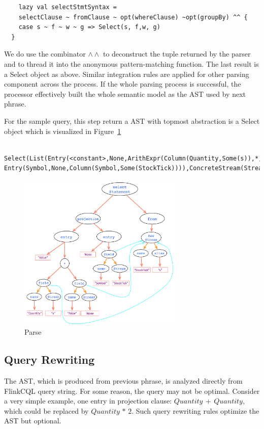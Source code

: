 \begin{itemize}
\begin{lstlisting}
	lazy val selectStmtSyntax = 
	selectClause ~ fromClause ~ opt(whereClause) ~opt(groupBy) ^^ {
    case s ~ f ~ w ~ g => Select(s, f,w, g)
  }
\end{lstlisting}

We do use the combinator $\wedge \wedge$ to deconstruct the tuple returned by the parser and to thread it into the anonymous pattern-matching function. The last result is a Select object as above. Similar integration rules are applied for other parsing component across the process. 
If the whole parsing process is successful, the processor effectively built the whole semantic model as the AST used by next phrase.

For the sample query, this step return a AST with topmost abstraction is a Select object which is visualized in Figure~\ref{fig:Parse}

\begin{lstlisting}	Select(List(Entry(<constant>,None,ArithExpr(Column(Quantity,Some(s)),*,Column(Price,None))), Entry(Symbol,None,Column(Symbol,Some(StockTick)))),ConcreteStream(Stream(StockTick,Some(s),false),None,None),None,None)
\end{lstlisting}
 

\end{itemize}


\begin{figure}[h!] 
\centering    
\includegraphics[width=0.7\textwidth]{Parse}
\caption{Parse}
\label{fig:Parse}
\end{figure}


\subsection{Query Rewriting}
The AST, which is produced from previous phrase, is analyzed directly from FlinkCQL query string. For some reason, the query may not be optimal. Consider a very simple example, one entry in projection clause: $Quantity\, +\, Quantity$, which could be replaced by $Quantity\, *\, 2$. Such query rewriting rules optimize the AST but optional. 

